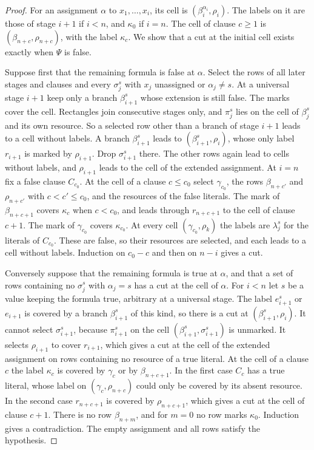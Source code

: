 \begin{proof}
For an assignment $\alpha$ to $x_1,\ldots,x_i$, its cell is
$(\beta_i^{\alpha_i},\rho_i)$. The labels on it are those of stage $i+1$
if $i<n$, and $\kappa_0$ if $i=n$. The cell of clause $c\ge1$ is
$(\beta_{n+c},\rho_{n+c})$, with the label $\kappa_c$. We show that a cut
at the initial cell exists exactly when $\Psi$ is false.

Suppose first that the remaining formula is false at $\alpha$. Select the
rows of all later stages and clauses and every $\sigma_j^s$ with $x_j$
unassigned or $\alpha_j\ne s$. At a universal stage $i+1$ keep only a
branch $\beta_{i+1}^s$ whose extension is still false. The marks cover the
cell. Rectangles join consecutive stages only, and $\pi_j^s$ lies on the
cell of $\beta_j^s$ and its own resource. So a selected row other than a
branch of stage $i+1$ leads to a cell without labels. A branch
$\beta_{i+1}^s$ leads to $(\beta_{i+1}^s,\rho_i)$, whose only label
$r_{i+1}$ is marked by $\rho_{i+1}$. Drop $\sigma_{i+1}^s$ there. The
other rows again lead to cells without labels, and $\rho_{i+1}$ leads to
the cell of the extended assignment. At $i=n$ fix a false clause
$C_{c_0}$. At the cell of a clause $c\le c_0$ select $\gamma_{c_0}$, the
rows $\beta_{n+c'}$ and $\rho_{n+c'}$ with $c<c'\le c_0$, and the
resources of the false literals. The mark of $\beta_{n+c+1}$ covers
$\kappa_c$ when $c<c_0$, and leads through $r_{n+c+1}$ to the cell of
clause $c+1$. The mark of $\gamma_{c_0}$ covers $\kappa_{c_0}$. At every
cell $(\gamma_{c_0},\rho_k)$ the labels are $\lambda_j^s$ for the literals
of $C_{c_0}$. These are false, so their resources are selected, and each
leads to a cell without labels. Induction on $c_0-c$ and then on $n-i$
gives a cut.

Conversely suppose that the remaining formula is true at $\alpha$, and that
a set of rows containing no $\sigma_j^s$ with $\alpha_j=s$ has a cut at the
cell of $\alpha$. For $i<n$ let $s$ be a value keeping the formula true,
arbitrary at a universal stage. The label $e_{i+1}^s$ or $e_{i+1}$ is
covered by a branch $\beta_{i+1}^s$ of this kind, so there is a cut at
$(\beta_{i+1}^s,\rho_i)$. It cannot select $\sigma_{i+1}^s$, because
$\pi_{i+1}^s$ on the cell $(\beta_{i+1}^s,\sigma_{i+1}^s)$ is unmarked. It
selects $\rho_{i+1}$ to cover $r_{i+1}$, which gives a cut at the cell of
the extended assignment on rows containing no resource of a true literal.
At the cell of a clause $c$ the label $\kappa_c$ is covered by $\gamma_c$
or by $\beta_{n+c+1}$. In the first case $C_c$ has a true literal, whose
label on $(\gamma_c,\rho_{n+c})$ could only be covered by its absent
resource. In the second case $r_{n+c+1}$ is covered by $\rho_{n+c+1}$,
which gives a cut at the cell of clause $c+1$. There is no row
$\beta_{n+m}$, and for $m=0$ no row marks $\kappa_0$. Induction gives a
contradiction. The empty assignment and all rows satisfy the hypothesis.
\end{proof}


